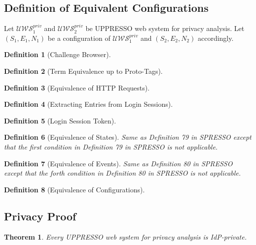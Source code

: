 \documentclass[letterpaper,onecolumn,10pt]{article}
\newtheorem{theorem}{Theorem}
\newtheorem{definition}{Definition}
\begin{document}
\subsection{Definition of Equivalent Configurations}

Let $\mathcal{U\!W\!S}^{priv}_1$ and $\mathcal{U\!W\!S}^{priv}_2$ be UPPRESSO web system for privacy analysis.
Let $(S_1,E_1,N_1)$ be a configuration of $\mathcal{U\!W\!S}^{priv}_1$ and $(S_2,E_2,N_2)$ accordingly.

\begin{definition}[Challenge Browser]
\end{definition}

\begin{definition}[Term Equivalence up to Proto-Tags]
\end{definition}

\begin{definition}[Equivalence of HTTP Requests]
\end{definition}

\begin{definition}[Extracting Entries from Login Sessions]
\end{definition}

\begin{definition}[Login Session Token]
\end{definition}

\begin{definition}[Equivalence of States]
  \label{def:C}
  Same as Definition 79 in SPRESSO except that the first condition in Definition 79 in SPRESSO is not applicable.
\end{definition}

\begin{definition}[Equivalence of Events]
  \label{def:Events}
  Same as Definition 80 in SPRESSO except that the forth condition in Definition 80 in SPRESSO is not applicable.
\end{definition}

\begin{definition}[Equivalence of Configurations]
\end{definition}

\subsection{Privacy Proof}

\begin{theorem} \label{theorem:A}Every UPPRESSO web system for privacy analysis is IdP-private.
\end{theorem}
\end{document}
